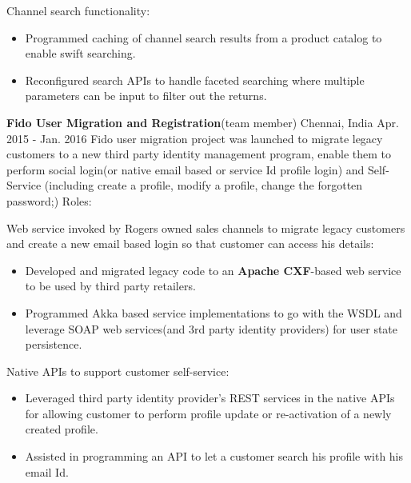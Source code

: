\begin{cventries}
{\begin{cvitems}
        \item {Channel search functionality:}
        \begin{itemize}
\item Programmed caching of channel search results from a product catalog to enable swift searching.
\end{itemize}
\begin{itemize}
\item Reconfigured search APIs to handle faceted searching where multiple parameters can be input to filter out the returns.  
\end{itemize}
             \end{cvitems}
    }
     
 
    \experienceentry
    {\textbf{Fido User Migration and Registration}(team member)}
    {}
    {Chennai, India}
    {Apr. 2015 - Jan. 2016}
    {Fido user migration project was launched to migrate legacy customers to a new third party identity management program, enable them to perform social login(or native email based or service Id profile login) and Self-Service (including create a profile, modify a profile, change the forgotten password;)}
    {Roles:}
    {
      \begin{cvitems}
        \item {Web service invoked by Rogers owned sales channels to migrate legacy customers and create a new email based login so that customer can access his details:}
\begin{itemize}
\item Developed and migrated legacy code to an \textbf{Apache CXF}-based web service to be used by third party retailers.
\end{itemize}
\begin{itemize}
\item Programmed Akka based service implementations to go with the WSDL and leverage SOAP web services(and 3rd party identity providers) for user state persistence.
\end{itemize}
        \item {Native APIs to support customer self-service:}
        \begin{itemize}
\item Leveraged third party identity provider's REST services in the native APIs for allowing customer to perform profile update or re-activation of a newly created profile.
\end{itemize}
\begin{itemize}
\item Assisted in programming an API to let a customer search his profile with his email Id.

\end{itemize}
\end{cvitems}}
\end{cventries}
